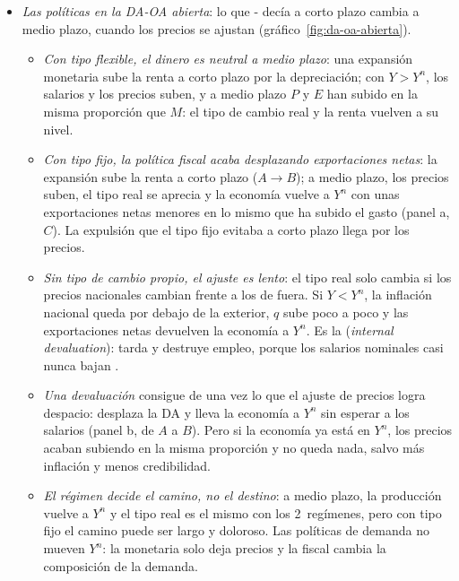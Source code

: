 \documentclass[11pt]{article}
\begin{document}
\begin{itemize}
\item \emph{Las políticas en la DA-OA abierta}: lo que - decía a corto plazo cambia a medio plazo, cuando los precios se ajustan (gráfico~\ref{fig:da-oa-abierta}).
  \begin{itemize}
  \item \emph{Con tipo flexible, el dinero es neutral a medio plazo}: una expansión monetaria sube la renta a corto plazo por la depreciación; con $Y>Y^n$, los salarios y los precios suben, y a medio plazo $P$ y $E$ han subido en la misma proporción que $M$: el tipo de cambio real y la renta vuelven a su nivel.
  \item \emph{Con tipo fijo, la política fiscal acaba desplazando exportaciones netas}: la expansión sube la renta a corto plazo ($A\to B$); a medio plazo, los precios suben, el tipo real se aprecia y la economía vuelve a $Y^n$ con unas exportaciones netas menores en lo mismo que ha subido el gasto (panel a, $C$). La expulsión que el tipo fijo evitaba a corto plazo llega por los precios.
  \item \emph{Sin tipo de cambio propio, el ajuste es lento}: el tipo real solo cambia si los precios nacionales cambian frente a los de fuera. Si $Y<Y^n$, la inflación nacional queda por debajo de la exterior, $q$ sube poco a poco y las exportaciones netas devuelven la economía a $Y^n$. Es la  (\emph{internal devaluation}): tarda y destruye empleo, porque los salarios nominales casi nunca bajan\nocite{SchmittGroheUribe2016Downward} .
  \item \emph{Una devaluación} consigue de una vez lo que el ajuste de precios logra despacio: desplaza la DA y lleva la economía a $Y^n$ sin esperar a los salarios (panel b, de $A$ a $B$). Pero si la economía ya está en $Y^n$, los precios acaban subiendo en la misma proporción y no queda nada, salvo más inflación y menos credibilidad.
  \item \emph{El régimen decide el camino, no el destino}: a medio plazo, la producción vuelve a $Y^n$ y el tipo real es el mismo con los 2~regímenes, pero con tipo fijo el camino puede ser largo y doloroso\nocite{Blanchard2021Macroeconomics}. Las políticas de demanda no mueven $Y^n$: la monetaria solo deja precios y la fiscal cambia la composición de la demanda.
  \end{itemize}
\end{itemize}
\end{document}
